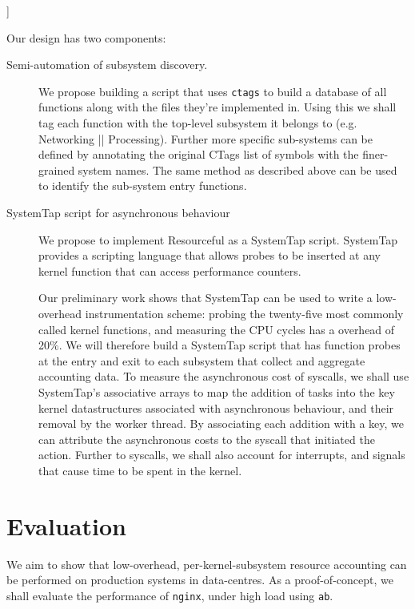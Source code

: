 ]\documentclass{article}
\begin{document}
Our design has two components:

\begin{description}
\item[Semi-automation of subsystem discovery.]
  We propose building a script that uses \texttt{ctags} to build a database of all functions along with the files they're implemented in.
  Using this we shall tag each function with the top-level subsystem it belongs to (e.g. Networking || Processing).
  Further more specific sub-systems can be defined by annotating the original CTags list of symbols with the finer-grained system names.
  The same method as described above can be used to identify the sub-system entry functions.


\item[SystemTap script for asynchronous behaviour]

  We propose to implement Resourceful as a SystemTap script.
SystemTap provides a scripting language that allows probes to be inserted at any kernel function that can access performance counters.

Our preliminary work shows that SystemTap can be used to write a low-overhead instrumentation scheme: probing the twenty-five most commonly called kernel functions, and measuring the CPU cycles has a overhead of 20\%.
We will therefore build a SystemTap script that has function probes at the entry and exit to each subsystem that collect and aggregate accounting data.
To measure the asynchronous cost of syscalls, we shall use SystemTap's associative arrays to map the addition of tasks into the key kernel datastructures associated with asynchronous behaviour, and their removal by the worker thread.
By associating each addition with a key, we can attribute the asynchronous costs to the syscall that initiated the action.
Further to syscalls, we shall also account for interrupts, and signals that cause time to be spent in the kernel. 


\end{description}

\section{Evaluation}

We aim to show that low-overhead, per-kernel-subsystem resource accounting can be performed on production systems in data-centres.
As a proof-of-concept, we shall evaluate the performance of \texttt{nginx}, under high load using \texttt{ab}.
\end{document}
